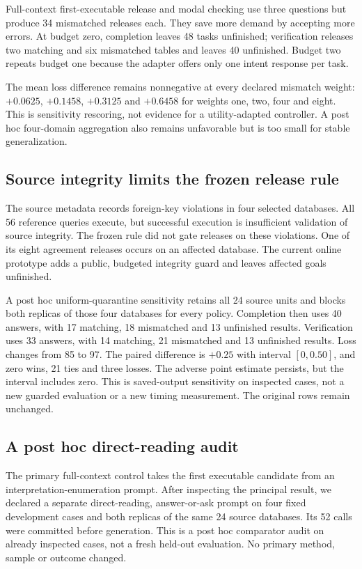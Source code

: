 \documentclass[11pt]{article}
\begin{document}
Full-context first-executable release and modal checking use three questions but produce 34 mismatched releases each. They save more demand by accepting more errors. At budget zero, completion leaves 48 tasks unfinished; verification releases two matching and six mismatched tables and leaves 40 unfinished. Budget two repeats budget one because the adapter offers only one intent response per task.

The mean loss difference remains nonnegative at every declared mismatch weight: $+0.0625$, $+0.1458$, $+0.3125$ and $+0.6458$ for weights one, two, four and eight. This is sensitivity rescoring, not evidence for a utility-adapted controller. A post hoc four-domain aggregation also remains unfavorable but is too small for stable generalization.

\subsection{Source integrity limits the frozen release rule}
The source metadata records foreign-key violations in four selected databases. All 56 reference queries execute, but successful execution is insufficient validation of source integrity. The frozen rule did not gate releases on these violations. One of its eight agreement releases occurs on an affected database. The current online prototype adds a public, budgeted integrity guard and leaves affected goals unfinished.

A post hoc uniform-quarantine sensitivity retains all 24 source units and blocks both replicas of those four databases for every policy. Completion then uses 40 answers, with 17 matching, 18 mismatched and 13 unfinished results. Verification uses 33 answers, with 14 matching, 21 mismatched and 13 unfinished results. Loss changes from 85 to 97. The paired difference is $+0.25$ with interval $[0,0.50]$, and zero wins, 21 ties and three losses. The adverse point estimate persists, but the interval includes zero. This is saved-output sensitivity on inspected cases, not a new guarded evaluation or a new timing measurement. The original rows remain unchanged.

\subsection{A post hoc direct-reading audit}
The primary full-context control takes the first executable candidate from an interpretation-enumeration prompt. After inspecting the principal result, we declared a separate direct-reading, answer-or-ask prompt on four fixed development cases and both replicas of the same 24 source databases. Its 52 calls were committed before generation. This is a post hoc comparator audit on already inspected cases, not a fresh held-out evaluation. No primary method, sample or outcome changed.
\end{document}
